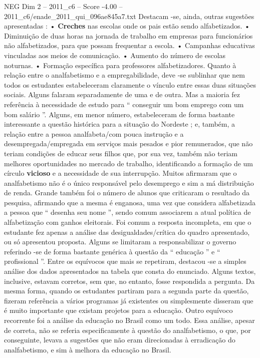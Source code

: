 \begin{textsample}{NEG Dim 2 – 2011\_c6 – Score -4.00 – 2011\_c6/enade\_2011\_qui\_096ae845a7.txt}
Destacam -se, ainda, outras sugestões apresentadas : • \textbf{Creches} nas escolas onde os pais estão sendo alfabetizados. • Diminuição de duas horas na jornada de trabalho em empresas para funcionários não alfabetizados, para que possam frequentar a escola. • Campanhas educativas vinculadas aos meios de comunicação. • Aumento do número de escolas noturnas. • Formação específica para professores alfabetizadores.
Quanto à relação entre o analfabetismo e a empregabilidade, deve -se sublinhar que nem todos os estudantes estabeleceram claramente o vínculo entre essas duas situações sociais.
Alguns falaram separadamente de uma e de outra.
Mas a maioria fez referência à necessidade de estudo para “ conseguir um bom emprego com um bom salário ”.
Alguns, em menor número, estabeleceram de forma bastante interessante a questão histórica para a situação do Nordeste ; e, também, a relação entre a pessoa analfabeta/com pouca instrução e a desempregada/empregada em serviços mais pesados e pior remunerados, que não teriam condições de educar seus filhos que, por sua vez, também não teriam melhores oportunidades no mercado de trabalho, identificando a formação de um círculo \textbf{vicioso} e a necessidade de sua interrupção.
Muitos afirmaram que o analfabetismo não é o único responsável pelo desemprego e sim a má distribuição de renda.
Grande também foi o número de alunos que criticaram o resultado da pesquisa, afirmando que a mesma é enganosa, uma vez que considera alfabetizada a pessoa que “ desenha seu nome ”, sendo comum associarem a atual política de alfabetização com ganhos eleitorais.
Foi comum a resposta incompleta, em que o estudante fez apenas a análise das desigualdades/crítica do quadro apresentado, ou só apresentou proposta.
Alguns se limitaram a responsabilizar o governo referindo -se de forma bastante genérica à questão da “ educação ” e “ profissional ”.
Entre os equívocos que mais se repetiram, destacou -se a simples análise dos dados apresentados na tabela que consta do enunciado.
Alguns textos, inclusive, estavam corretos, sem que, no entanto, fosse respondida a pergunta.
Da mesma forma, quando os estudantes partiram para a segunda parte da questão, fizeram referência a vários programas já existentes ou simplesmente disseram que é muito importante que existam projetos para a educação.
Outro equívoco recorrente foi a análise da educação no Brasil como um todo.
Essa análise, apesar de correta, não se referia especificamente à questão do analfabetismo, o que, por conseguinte, levava a sugestões que não eram direcionadas à erradicação do analfabetismo, e sim à melhora da educação no Brasil.

\end{textsample}
